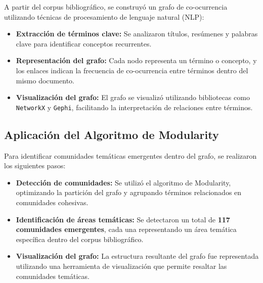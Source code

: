 \begin{refsection}
A partir del corpus bibliográfico, se construyó un grafo de co-ocurrencia utilizando técnicas de procesamiento de lenguaje natural (NLP):
\begin{itemize}
    \item \textbf{Extracción de términos clave:} Se analizaron títulos, resúmenes y palabras clave para identificar conceptos recurrentes.
    \item \textbf{Representación del grafo:} Cada nodo representa un término o concepto, y los enlaces indican la frecuencia de co-ocurrencia entre términos dentro del mismo documento.
    \item \textbf{Visualización del grafo:} El grafo se visualizó utilizando bibliotecas como \texttt{NetworkX} y \texttt{Gephi}, facilitando la interpretación de relaciones entre términos.
\end{itemize}

\subsection{Aplicación del Algoritmo de Modularity}

Para identificar comunidades temáticas emergentes dentro del grafo, se realizaron los siguientes pasos:
\begin{itemize}
    \item \textbf{Detección de comunidades:} Se utilizó el algoritmo de Modularity, optimizando la partición del grafo y agrupando términos relacionados en comunidades cohesivas.
    \item \textbf{Identificación de áreas temáticas:} Se detectaron un total de \textbf{117 comunidades emergentes}, cada una representando un área temática específica dentro del corpus bibliográfico.
    \item \textbf{Visualización del grafo:} La estructura resultante del grafo fue representada utilizando una herramienta de visualización que permite resaltar las comunidades temáticas.
\end{itemize}


\end{refsection}
